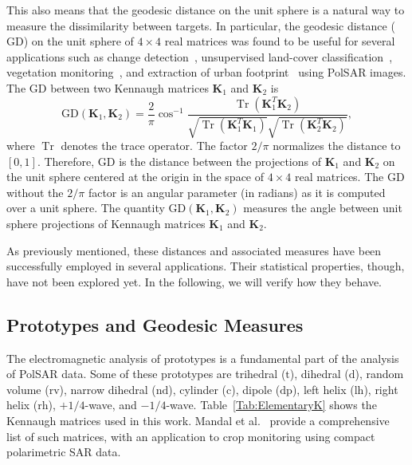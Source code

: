 \documentclass[journal]{IEEEtran}
\DeclareMathOperator{\Tr}{Tr}
\begin{document}
This also means that the geodesic distance on the unit sphere is a natural way to measure the dissimilarity between targets. 
In particular, the geodesic distance ($\text{GD}$) on the unit sphere of $4 \times 4$ real matrices was found to be useful for several applications such as change detection~\cite{ChangeDetectionPolSARGeodesicDistanceBetweenScatteringMechanisms}, 
unsupervised land-cover classification~\cite{ClassificationPolSARGeodesic}, 
vegetation monitoring~\cite{AGeneralizedVolumeScatteringModelBasedVegetationIndexfromPolarimetricSARData2019}, and 
extraction of urban footprint~\cite{NovelTechniquesforBuiltupAreaExtractionfromPolarimetricSARImages2019} using PolSAR images. 
The $\text{GD}$ between two Kennaugh matrices $\bm{K}_1$ and $\bm{K}_2$ is
\begin{equation}
\text{GD}(\bm{K}_1,\bm{K}_2) =  \frac{2}{\pi} \cos^{-1}\frac{\Tr(\bm{K}_1^T\bm{K}_2)}{\sqrt{\Tr(\bm{K}_1^T\bm{K}_1)}\sqrt{\Tr(\bm{K}_2^T\bm{K}_2)}} ,
\label{eq:GD_Ken}
\end{equation}
where $\Tr$ denotes the trace operator. 
The factor $2/\pi$ normalizes the distance to $[0,1]$. 
Therefore, $\text{GD}$ is the distance between the projections of $\bm{K}_1$ and $\bm{K}_2$ on the unit sphere centered at the origin in the space of $4 \times 4$ real matrices. 
The $\text{GD}$ without the $2/\pi$ factor is an angular parameter (in radians) as it is computed over a unit sphere. 
The quantity $\text{GD}(\bm{K}_1, \bm{K}_2)$ measures the angle between unit sphere projections of Kennaugh matrices $\bm{K}_1$ and  $\bm{K}_2$.

As previously mentioned, these distances and associated measures have been successfully employed in several applications.
Their statistical properties, though, have not been explored yet.
In the following, we will verify how they behave.

\subsection{Prototypes and Geodesic Measures}

The electromagnetic analysis of prototypes is a fundamental part of the analysis of PolSAR data.
Some of these prototypes are
{trihedral} ($\text{t}$), 
{dihedral} ($\text{d}$), 
{random volume} ($\text{rv}$), 
{narrow dihedral} ($\text{nd}$), 
{cylinder} ($\text{c}$), 
{dipole} ($\text{dp}$), 
{left helix} ($\text{lh}$), 
{right helix} ($\text{rh}$), 
{$+1/4$-wave}, 
and {$-1/4$-wave}.
Table~\ref{Tab:ElementaryK} shows the Kennaugh matrices used in this work.
Mandal et al.~\cite{ARadarVegetationIndexforCropMonitoringUsingCompactPolarimetricSARData} provide a comprehensive list of such matrices, with an application to crop monitoring using compact polarimetric SAR data.
\end{document}
